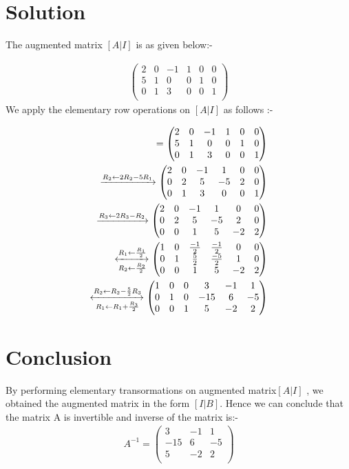 \documentclass[journal,12pt,twocolumn]{IEEEtran}
\newcommand{\myvec}[1]{\ensuremath{\begin{pmatrix}#1\end{pmatrix}}}
\begin{document}
\section{Solution}

The augmented matrix $ [A | I]$ is as given below:- 

\begin{align}
\myvec{
		 2 &0 &-1&  1 & 0 &  0 \\
		   5 &1 &0&  0 &  1 &  0 \\
		 0 &1 &3 &  0 &  0 &  1 \\
		 }
 \end{align}
 We apply the elementary row operations on $ [A | I]$ as follows :-
 
\begin{align}
 [A | I] = \myvec{
		 2 &0 &-1&  1 & 0 &  0 \\
		   5 &1 &0&  0 &  1 &  0 \\
		 0 &1 &3 &  0 &  0 &  1 \\
		 } \\
\xrightarrow{R_2\leftarrow 2R_2 - 5R_1} \myvec{
		 2 &0 &-1&  1 & 0 &  0 \\
		  0 &2 &5&  -5 &  2 &  0 \\
		 0 &1 &3 &  0 &  0 &  1 \\
		 } 
		 \\
 \xrightarrow{R_3\leftarrow 2R_3 - R_2} \myvec{
		 2 &0 &-1&  1 & 0 &  0 \\
		  0 &2 &5&  -5 &  2 &  0 \\
		 0 &0 &1 &  5 &  -2 &  2 \\
		 } \\
\xleftrightarrow[R_2\leftarrow \frac{R_2}{2}]{R_1\leftarrow \frac{R_1}{2}}\myvec{
		 1 & 0 & \frac{-1}{2} & \frac{-1}{2} & 0 &  0 \\
		  0 & 1 & \frac{5}{2} & \frac{-5}{2} &  1 &  0 \\
		 0 & 0 &1 &  5 &  -2 &  2 \\
		 } 	\\	 
\xleftrightarrow[R_1\leftarrow R_1  + \frac{R_3}{2}]{R_2\leftarrow R_2 - \frac{5}{2}R_3}\myvec{
		 1 & 0 & 0 & 3 & -1 &  1 \\
		  0 & 1 & 0 & -15 &  6 &  -5 \\
		 0 & 0 &1 &  5 &  -2 &  2 \\
		 } 		
\end{align}
\section{Conclusion}
By performing elementary transormations on augmented matrix$ [A | I]$ , we obtained the augmented matrix in the form $ [I|B]$. 
Hence we can conclude that the matrix A is invertible and inverse of the matrix is:-
\begin{align}
A^{-1} = \myvec{
		  3 & -1 &  1 \\
		 -15 &  6 & -5 \\
		  5 &  -2 &  2 \\
		 }
\end{align}
\end{document}
